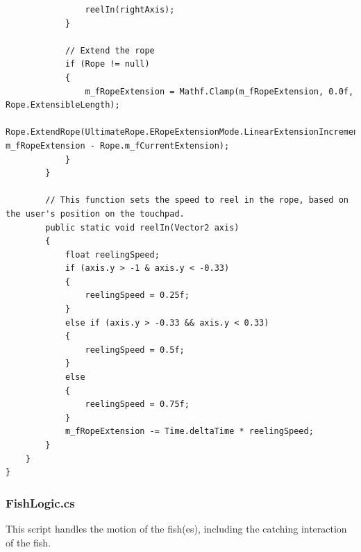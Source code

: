\documentclass[10pt,journal,compsoc,onecolumn, draftclsnofoot]{IEEEtran}
\begin{document}
\begin{verbatim}
                reelIn(rightAxis);
            }

            // Extend the rope
            if (Rope != null)
            {
                m_fRopeExtension = Mathf.Clamp(m_fRopeExtension, 0.0f, Rope.ExtensibleLength);
                Rope.ExtendRope(UltimateRope.ERopeExtensionMode.LinearExtensionIncrement, m_fRopeExtension - Rope.m_fCurrentExtension);
            }
        }

        // This function sets the speed to reel in the rope, based on the user's position on the touchpad.
        public static void reelIn(Vector2 axis)
        {
            float reelingSpeed;
            if (axis.y > -1 & axis.y < -0.33)
            {
                reelingSpeed = 0.25f;
            }
            else if (axis.y > -0.33 && axis.y < 0.33)
            {
                reelingSpeed = 0.5f;
            }
            else
            {
                reelingSpeed = 0.75f;
            }
            m_fRopeExtension -= Time.deltaTime * reelingSpeed;
        }
    }
}
\end{verbatim}

\subsubsection{FishLogic.cs}
This script handles the motion of the fish(es), including the catching interaction of the fish.\\
\end{document}
